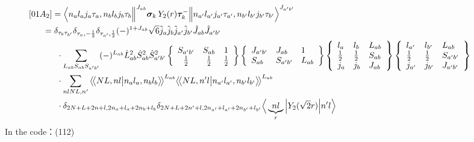 \documentclass[master]{shnuthesis}
\newcommand{\llangle}{\big\langle\!\big\langle}
\newcommand{\rrangle}{\big\rangle\!\big\rangle}
\newcommand{\ap}{a^\prime}
\newcommand{\bp}{b^\prime}
\newcommand{\il}{\!\!\!\!\!\!\!\!\!\!}
\newcommand{\ii}{\!\!\!\!\!\!\!\!\!\!\!\!\!\!\!\!\!\!\!\!}
\begin{document}
\begin{align}
    &\ii [01A_2] = \Big\langle n_a l_a j_a \tau_a, n_b l_b j_b \tau_b \Big\|^{J_{ab}} \bm{\sigma}_k\, Y_2(r) \bm{\tau}_k^- \Big\| n_{\ap} l_{\ap} j_{\ap} \tau_{\ap}, n_{\bp} l_{\bp} j_{\bp} \tau_{\bp} \Big\rangle^{J_{\ap \bp}} \\
    &\il = \delta_{\tau_b \tau_{\bp}}\delta_{\tau_a, -\frac{1}{2}}\delta_{\tau_{\ap}, \frac{1}{2}} (-)^{1+J_{ab}}\sqrt{6}\hat{j}_a\hat{j}_b\hat{j}_{\ap}\hat{j}_{\bp}\hat{J}_{ab}\hat{J}_{\ap\bp}  \notag\\
    & \cdot \sum_{L_{ab}S_{ab}S_{\ap\bp}} (-)^{L_{ab}} \hat{L}_{ab}^2\hat{S}_{ab}^2\hat{S}_{\ap\bp}^2  \left\{\begin{array}{ccc} S_{\ap\bp} & S_{ab} & 1 \\ \frac{1}{2} & \frac{1}{2} & \frac{1}{2} \end{array}\right\}  \left\{\begin{array}{lll} J_{\ap\bp} & J_{ab} & 1 \\ S_{ab} & S_{\ap\bp} & L_{ab} \end{array}\right\}  \left\{\begin{array}{lll}l_{a} & l_{b} & L_{ab} \\ \frac{1}{2} & \frac{1}{2} & S_{ab} \\j_{a} & j_{b} & J_{ab} \end{array}\right\} \left\{\begin{array}{lll} l_{\ap} & l_{\bp} & L_{ab} \\ \frac{1}{2} & \frac{1}{2} & S_{\ap\bp} \\j_{\ap} & j_{\bp} & J_{\ap\bp} \end{array}\right\}  \notag \\
    & \cdot \sum_{nlNL,n^\prime} \llangle N L, n l \big| n_{a} l_{a}, n_{b} l_{b} \rrangle^{L_{ab}} \llangle N L, n^\prime l \big| n_{a^\prime} l_{a^\prime}, n_{b^\prime} l_{b^\prime} \rrangle^{L_{ab}} \notag\\
    & \cdot \delta_{2N+L+2n+l,2n_a+l_a+2n_b+l_b}\delta_{2N+L+2n^\prime+l,2n_{a^\prime}+l_{a^\prime}+2n_{b^\prime}+l_{b^\prime}} \Big\langle \underbrace{n l}_{r} \Big| Y_2(\sqrt{2}r) \Big| n^\prime l \Big\rangle
\end{align}
In the code：(112)
\end{document}
